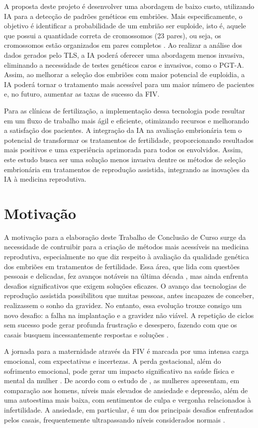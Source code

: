 A proposta deste projeto é desenvolver uma abordagem de baixo custo, utilizando IA para a detecção de padrões genéticos em embriões. Mais especificamente, o objetivo é identificar a probabilidade de um embrião ser euploide, isto é, aquele que possui a quantidade correta de cromossomos (23 pares), ou seja, os cromossomos estão organizados em pares completos \cite{zegers2017}. Ao realizar a análise dos dados gerados pelo TLS, a IA poderá oferecer uma abordagem menos invasiva, eliminando a necessidade de testes genéticos caros e invasivos, como o PGT-A. Assim, ao melhorar a seleção dos embriões com maior potencial de euploidia, a IA poderá tornar o tratamento mais acessível para um maior número de pacientes e, no futuro, aumentar as taxas de sucesso da FIV.

Para as clínicas de fertilização, a implementação dessa tecnologia pode resultar em um fluxo de trabalho mais ágil e eficiente, otimizando recursos e melhorando a satisfação dos pacientes. A integração da IA na avaliação embrionária tem o potencial de transformar os tratamentos de fertilidade, proporcionando resultados mais positivos e uma experiência aprimorada para todos os envolvidos. Assim, este estudo busca ser uma solução menos invasiva dentre os métodos de seleção embrionária em tratamentos de reprodução assistida, integrando as inovações da IA à medicina reprodutiva.

\section{Motivação}

A motivação para a elaboração deste Trabalho de Conclusão de Curso surge da necessidade de contruibir para a criação de métodos mais acessíveis na medicina reprodutiva, especialmente no que diz respeito à avaliação da qualidade genética dos embriões em tratamentos de fertilidade. Essa área, que lida com questões pessoais e delicadas, fez avanços notáveis na última década \cite{pandit2022}, mas ainda enfrenta desafios significativos que exigem soluções eficazes. O avanço das tecnologias de reprodução assistida possibilitou que muitas pessoas, antes incapazes de conceber, realizassem o sonho da gravidez. No entanto, essa evolução trouxe consigo um novo desafio: a falha na implantação e a gravidez não viável. A repetição de ciclos sem sucesso pode gerar profunda frustração e desespero, fazendo com que os casais busquem incessantemente respostas e soluções \cite{montagnini2010}.

A jornada para a maternidade através da FIV é marcada por uma intensa carga emocional, com expectativas e incertezas. A perda gestacional, além do sofrimento emocional, pode gerar um impacto significativo na saúde física e mental da mulher  \cite{montagnini2010}. De acordo com o estudo de , as mulheres apresentam, em comparação aos homens, níveis mais elevados de ansiedade e depressão, além de uma autoestima mais baixa, com sentimentos de culpa e vergonha relacionados à infertilidade. A ansiedade, em particular, é um dos principais desafios enfrentados pelos casais, frequentemente ultrapassando níveis considerados normais \cite{montagnini2010}.


